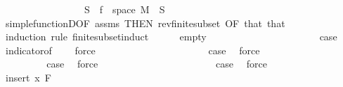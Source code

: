 \begin{isabellebody}
\ \ \ \ \ \ \ \ \ \ \ \ \ \ \ \ \ {\isachardoublequoteopen}S\ {\isasymsubseteq}\ f\ {\isacharbackquote}{\kern0pt}\ space\ M{\isachardoublequoteclose}\ \ S\ \isamarkupfalse%
\ simple{\isacharunderscore}{\kern0pt}functionD{\isacharparenleft}{\kern0pt}{}{\isacharparenright}{\kern0pt}{\isacharbrackleft}{\kern0pt}OF\ assms{\isacharparenleft}{\kern0pt}{}{\isacharparenright}{\kern0pt}{\isacharcomma}{\kern0pt}\ THEN\ rev{\isacharunderscore}{\kern0pt}finite{\isacharunderscore}{\kern0pt}subset{\isacharcomma}{\kern0pt}\ OF\ that{\isacharbrackright}{\kern0pt}\ that\ \isanewline
\ \ \isamarkupfalse%
\ {\isacharparenleft}{\kern0pt}induction\ rule{\isacharcolon}{\kern0pt}\ finite{\isacharunderscore}{\kern0pt}subset{\isacharunderscore}{\kern0pt}induct{\isacharprime}{\kern0pt}{\isacharparenright}{\kern0pt}\isanewline
\ \ \ \ \isamarkupfalse%
\ empty\isanewline
\ \ \ \ \isacommand{{\isacharbraceleft}{\kern0pt}}\isamarkupfalse%
\isanewline
\ \ \ \ \ \ \isamarkupfalse%
\ {}\isanewline
\ \ \ \ \ \ \isamarkupfalse%
\ \isamarkupfalse%
\ {\isacharquery}{\kern0pt}case\ \isamarkupfalse%
\ indicator{\isacharbrackleft}{\kern0pt}of\ {}\ {\isachardoublequoteopen}{\isacharbraceleft}{\kern0pt}{\isacharbraceright}{\kern0pt}{\isachardoublequoteclose}{\isacharbrackright}{\kern0pt}\ \isamarkupfalse%
\ force\isanewline
\ \ \ \ \isamarkupfalse%
\isanewline
\ \ \ \ \ \ \isamarkupfalse%
\ {}\isanewline
\ \ \ \ \ \ \isamarkupfalse%
\ \isamarkupfalse%
\ {\isacharquery}{\kern0pt}case\ \isamarkupfalse%
\ force\ \isanewline
\ \ \ \ \isamarkupfalse%
\isanewline
\ \ \ \ \ \ \isamarkupfalse%
\ {}\isanewline
\ \ \ \ \ \ \isamarkupfalse%
\ \isamarkupfalse%
\ {\isacharquery}{\kern0pt}case\ \isamarkupfalse%
\ force\ \isanewline
\ \ \ \ \isamarkupfalse%
\isanewline
\ \ \ \ \ \ \isamarkupfalse%
\ {}\isanewline
\ \ \ \ \ \ \isamarkupfalse%
\ \isamarkupfalse%
\ {\isacharquery}{\kern0pt}case\ \isamarkupfalse%
\ force\ \isanewline
\ \ \ \ \isacommand{{\isacharbraceright}{\kern0pt}}\isamarkupfalse%
\isanewline
\ \ \isamarkupfalse%
\isanewline
\ \ \ \ \isamarkupfalse%
\ {\isacharparenleft}{\kern0pt}insert\ x\ F{\isacharparenright}{\kern0pt}\isanewline

\end{isabellebody}
